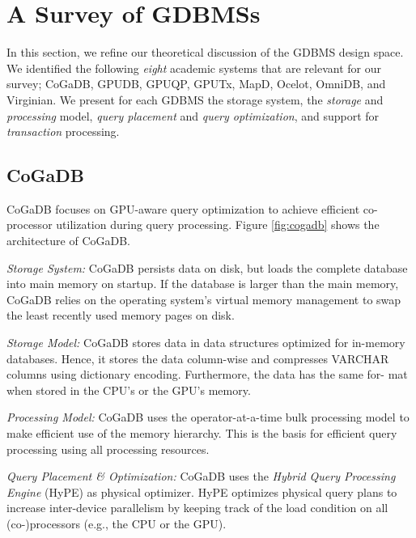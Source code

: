 \documentclass[twocolumn]{article}
\begin{document}
\section{A Survey of GDBMSs}
In this section, we refine our theoretical discussion of the GDBMS design space.
We identified the following \textit{eight} academic systems that are relevant for our survey; CoGaDB, GPUDB, GPUQP, GPUTx, MapD, Ocelot, OmniDB, and Virginian. We present for each GDBMS the storage system, the \textit{storage} and \textit{processing} model, \textit{query placement} and \textit{query optimization}, and support for \textit{transaction} processing.

\subsection{CoGaDB}
CoGaDB focuses on GPU-aware query optimization to achieve efficient co-processor utilization during query processing.
Figure \ref{fig:cogadb} shows the architecture of CoGaDB.

\noindent
\textit{Storage System:} 
CoGaDB persists data on disk, but loads the complete database into main memory on startup. If the database is larger than the main memory, CoGaDB relies on the operating system’s virtual memory management to swap the least recently used memory pages on disk.

\noindent
\textit{Storage Model:}
 CoGaDB stores data in data structures optimized for in-memory databases. Hence, it stores the data column-wise and compresses VARCHAR columns using dictionary encoding. Furthermore, the data has the same for- mat when stored in the CPU’s or the GPU’s memory.

\noindent
\textit{Processing Model:} CoGaDB uses the operator-at-a-time bulk processing model to make efficient use of the memory hierarchy. This is the basis for efficient query processing using all processing resources.

\noindent
\textit{Query Placement \& Optimization:} CoGaDB uses the \textit{Hybrid Query Processing Engine} (HyPE) as physical optimizer. HyPE optimizes physical query plans to increase inter-device parallelism by keeping track of the load condition on all (co-)processors (e.g., the CPU or the GPU).
\end{document}
